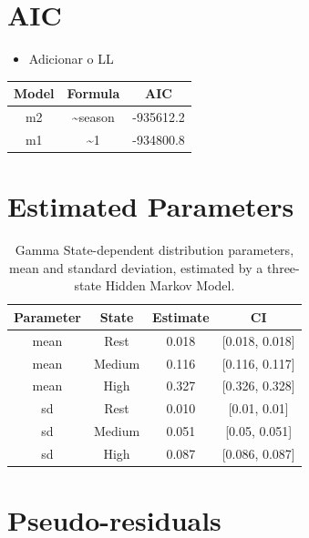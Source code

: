 \documentclass[english,msc,numbers,hidelinks]{coppe}
\providecommand{\tightlist}{%
  \setlength{\itemsep}{0pt}\setlength{\parskip}{0pt}}
\begin{document}
  \hypertarget{aic}{%
  \section{AIC}\label{aic}}
  \begin{itemize}
  \tightlist
  \item
    Adicionar o LL
  \end{itemize}
  \begin{table}[!h]
  \centering
  \begin{tabular}{ccc}
  \toprule
  Model & Formula & AIC\\
  \midrule
  m2 & \textasciitilde{}season & -935612.2\\
  m1 & \textasciitilde{}1 & -934800.8\\
  \bottomrule
  \end{tabular}
  \end{table}
  \hypertarget{estimated-parameters}{%
  \section{Estimated Parameters}\label{estimated-parameters}}
  \begin{table}[!h]

  \caption{\label{tab:appendix-parameters}Gamma State-dependent distribution parameters, mean and standard deviation, estimated by a three-state Hidden Markov Model.}
  \centering
  \begin{tabular}[t]{cccc}
  \toprule
  Parameter & State & Estimate & CI\\
  \midrule
  mean & Rest & 0.018 & {}[0.018, 0.018]\\
  mean & Medium & 0.116 & {}[0.116, 0.117]\\
  mean & High & 0.327 & {}[0.326, 0.328]\\
  sd & Rest & 0.010 & {}[0.01, 0.01]\\
  sd & Medium & 0.051 & {}[0.05, 0.051]\\
  \addlinespace
  sd & High & 0.087 & {}[0.086, 0.087]\\
  \bottomrule
  \end{tabular}
  \end{table}
  \hypertarget{pseudo-residuals}{%
  \section{Pseudo-residuals}\label{pseudo-residuals}}
\end{document}
